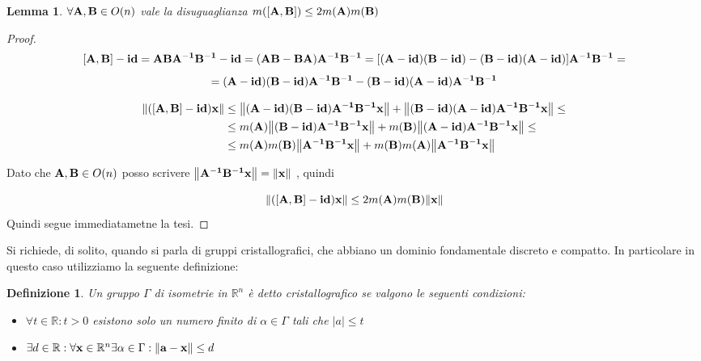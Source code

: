 \documentclass[10pt,a4paper]{article}
\newtheorem{definition}{Definizione}[section]
\newtheorem{lemma}[theorem]{Lemma}
\begin{document}
\begin{lemma}
 $\forall \vb{ A, B} \in O(n)$ vale la disuguaglianza $ m([\vb{A,B}]) \leq 2m(\vb{A})m(\vb{B})$ 
\end{lemma}

\begin{proof}



\[ [\vb{A,B}] - \vb{id} = \vb{ABA^{-1}B^{-1} - id }= \vb{(AB -BA)A^{-1}B^{-1} }= [ \vb{ (A-id)(B-id) - (B-id)(A-id)}] \vb{A^{-1}B^{-1}} = \]
 \[  = \vb{( A-id)(B-id) A^{-1}B^{-1} -  (B-id)(A-id) A^{-1}B^{-1}} \]
 
 
 \begin{equation} 
\begin{split}
\norm{\vb{([A,B] - id )x}} & \leq \norm{\vb{ ( A-id)(B-id) A^{-1}B^{-1}x}} +  \norm{\vb{(B-id)(A-id) A^{-1}B^{-1}x}} \leq \\
& \leq m(\vb{A}) \norm{\vb{(B-id) A^{-1}B^{-1}x}} + m(\vb{B}) \norm{\vb{(A-id) A^{-1}B^{-1}x}} \leq \\ 
& \leq m(\vb{A})m(\vb{B})\norm{\vb{A^{-1}B^{-1}x}} + m(\vb{B})m(\vb{A}) \norm{\vb{A^{-1}B^{-1}x}}
\end{split}
\end{equation}

Dato che $ \vb{A,B} \in O(n)$ posso scrivere $\norm{\vb{A^{-1}B^{-1}x}} = \norm{\vb{x}} $ , quindi 

\begin{equation}
  \norm{\vb{([A,B] - id )x}}  \leq 2m(\vb{A})m(\vb{B})\norm{\vb{x}}
\end{equation} 
Quindi segue immediatametne la tesi. 
\end{proof}
Si richiede, di solito, quando si parla di gruppi cristallografici, che abbiano un dominio fondamentale discreto e compatto. In particolare in questo caso utilizziamo la seguente definizione:

\begin{definition}
Un gruppo $\Gamma$ di isometrie in $\mathbb{R}^{n}$ è detto cristallografico se valgono le seguenti condizioni:
\begin{itemize}
	\item $ \forall t \in \mathbb{R} : t > 0 $  esistono solo un numero finito di $\alpha \in \Gamma $  tali che  $|a| \leq t$

	\item $ \exists d \in \mathbb{R}: \forall \vb{x} \in \mathbb{R}^n   \exists \alpha \in \Gamma : \norm{\vb{a-x}}\leq d $
\end{itemize}
\end{definition}
\end{document}
